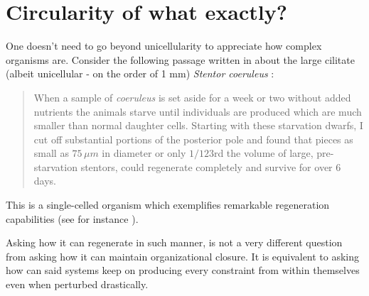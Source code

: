 \documentclass[a4paper,12pt,twoside,leqno]{article}
\begin{document}
\section{Circularity of what exactly?}

One doesn't need to go beyond unicellularity to appreciate how complex organisms are. Consider the following passage written in \cite{tartar1961biology} about the large cilitate (albeit unicellular - on the order of 1 mm) \emph{Stentor coeruleus
}:

\begin{quote}
When a sample of \emph{coeruleus} is set aside for a week or two without
added nutrients the animals starve until individuals are produced
which are much smaller than normal daughter cells. Starting with
these starvation dwarfs, I cut off substantial portions of the posterior
pole and found that pieces as small as $75\,\mu m$ in diameter or only
$1/123$rd the volume of large, pre-starvation stentors, could regenerate completely and survive for over 6 days.
\end{quote}

This is a single-celled organism which exemplifies remarkable regeneration capabilities (see for instance \cite{slabodnick2014stentor, tartar1961biology, marshall2021regeneration}).

Asking how it can regenerate in such manner, is not a very different question from asking how it can maintain organizational closure. It is equivalent to asking how can said systems keep on producing every constraint from within themselves even when perturbed drastically.
\end{document}

